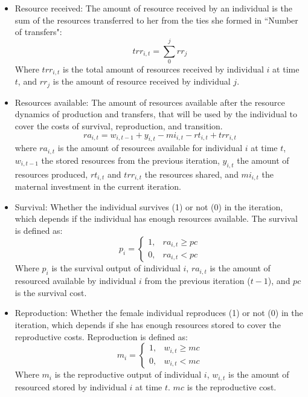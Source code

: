 \documentclass{article}
\begin{document}
\begin{itemize}
        \item Resource received: The amount of resource received by an individual is the sum of the resources transferred to her from the ties she formed in ``Number of transfers":
\begin{equation}
    trr_{i,t}=\sum_0^j rr_j        
\end{equation}
        Where $trr_{i,t}$ is the total amount of resources received by individual $i$ at time $t$, and $rr_j$ is the amount of resource received by individual $j$.
        \item Resources available: The amount of resources available after the resource dynamics of production and transfers, that will be used by the individual to cover the costs of survival, reproduction, and transition.
\begin{equation}
    ra_{i,t}=w_{i,t-1}+y_{i,t}-mi_{i,t}-rt_{i,t}+trr_{i,t}        
\end{equation}
        where $ra_{i,t}$ is the amount of resources available for individual $i$ at time $t$, $w_{i,t-1}$ the stored resources from the previous iteration, $y_{i,t}$ the amount of resources produced, $rt_{i,t}$ and $trr_{i,t}$ the resources shared, and $mi_{i,t}$ the maternal investment in the current iteration.
        \item Survival: Whether the individual survives (1) or not (0) in the iteration, which depends if the individual has enough resources available. The survival is defined as:
\begin{equation}
    p_i=\begin{cases}
    1,& ra_{i,t} \geq pc\\
    0,& ra_{i,t} < pc
\end{cases}
\end{equation}
        Where $p_i$ is the survival output of individual $i$, $ra_{i,t}$ is the amount of resourced available by individual $i$ from the previous iteration ($t-1$), and $pc$ is the survival cost.
        \item Reproduction: Whether the female individual reproduces (1) or not (0) in the iteration, which depends if she has enough resources stored to cover the reproductive costs. Reproduction is defined as:
\begin{equation}
    m_i=\begin{cases}
    1,& w_{i,t} \geq mc\\
    0,& w_{i,t} < mc
\end{cases}
\end{equation}
        Where $m_i$ is the reproductive output of individual $i$, $w_{i,t}$ is the amount of resourced stored by individual $i$ at time $t$. $mc$ is the reproductive cost.

\end{itemize}
\end{document}
